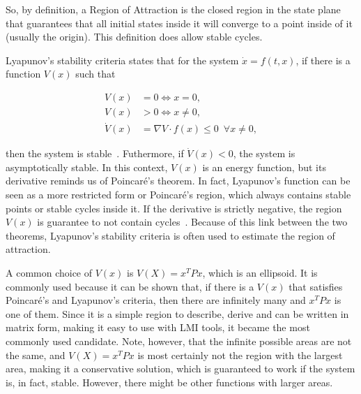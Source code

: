 So, by definition, a Region of Attraction is the closed region in the state
plane that guarantees that all initial states inside it will converge to a point
inside of it (usually the origin). This definition does allow stable cycles.

Lyapunov's stability criteria states that for the system \(\dot{x} = f(t, x)\),
if there is a function \(V(x)\) such that

\begin{align}
	V(x)       & = 0 \iff x = 0,                                \\
	V(x)       & > 0 \iff x \ne 0,                              \\
	\dot{V}(x) & = \nabla{}V\cdot{}f(x) \le 0 \phantom{0} \forall x \ne 0,
\end{align}

then the system is stable~\citep{chi-tsongchen2012,Hespanha09}. Futhermore, if
\(\dot{V}(x)<0\), the system is asymptotically stable. In this context, \(V(x)\)
is an energy function, but its derivative reminds us of Poincaré's theorem. In
fact, Lyapunov's function can be seen as a more restricted form or Poincaré's
region, which always contains stable points or stable cycles inside it. If the
derivative is strictly negative, the region \(V(x)\) is guarantee to not contain
cycles~\citep{chi-tsongchen2012}. Because of this link between the two theorems,
Lyapunov's stability criteria is often used to estimate the region of
attraction.

A common choice of \(V(x)\) is \(V(X)=x^{T}Px\), which is an ellipsoid. It is
commonly used because it can be shown that, if there is a \(V(x)\) that
satisfies Poincaré's and Lyapunov's criteria, then there are infinitely many and
\(x^{T}Px\) is one of them. Since it is a simple region to describe, derive and
can be written in matrix form, making it easy to use with LMI tools, it became
the most commonly used candidate. Note, however, that the infinite possible
areas are not the same, and \(V(X)=x^{T}Px\) is most certainly not the region
with the largest area, making it a conservative solution, which is guaranteed to
work if the system is, in fact, stable. However, there might be other functions
with larger areas.

